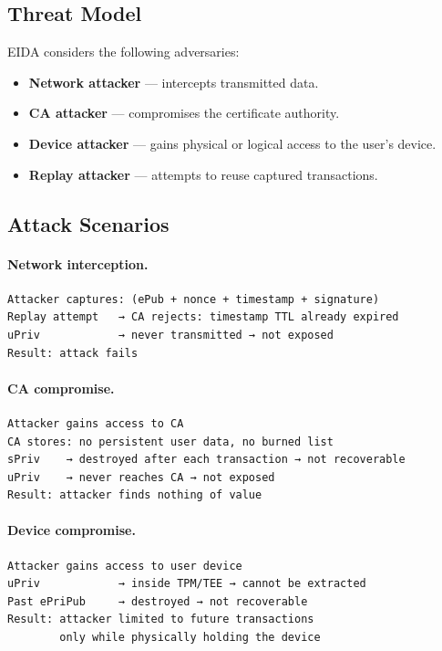 \documentclass[11pt,a4paper]{article}
\begin{document}
\subsection{Threat Model}

EIDA considers the following adversaries:
\begin{itemize}
  \item \textbf{Network attacker} --- intercepts transmitted data.
  \item \textbf{CA attacker} --- compromises the certificate authority.
  \item \textbf{Device attacker} --- gains physical or logical access to the
        user's device.
  \item \textbf{Replay attacker} --- attempts to reuse captured transactions.
\end{itemize}

\subsection{Attack Scenarios}

\paragraph{Network interception.}
\begin{lstlisting}[style=protocol]
Attacker captures: (ePub + nonce + timestamp + signature)
Replay attempt   → CA rejects: timestamp TTL already expired
uPriv            → never transmitted → not exposed
Result: attack fails
\end{lstlisting}

\paragraph{CA compromise.}
\begin{lstlisting}[style=protocol]
Attacker gains access to CA
CA stores: no persistent user data, no burned list
sPriv    → destroyed after each transaction → not recoverable
uPriv    → never reaches CA → not exposed
Result: attacker finds nothing of value
\end{lstlisting}

\paragraph{Device compromise.}
\begin{lstlisting}[style=protocol]
Attacker gains access to user device
uPriv            → inside TPM/TEE → cannot be extracted
Past ePriPub     → destroyed → not recoverable
Result: attacker limited to future transactions
        only while physically holding the device
\end{lstlisting}
\end{document}
